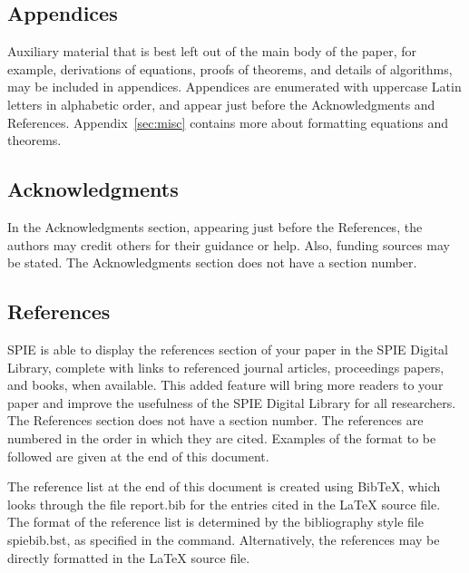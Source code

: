 \documentclass[nocompress]{spie}  %
\begin{document}
\subsection{Appendices}
Auxiliary material that is best left out of the main body of the paper, for example, derivations of equations, proofs of theorems, and details of algorithms, may be included in appendices.  Appendices are enumerated with uppercase Latin letters in alphabetic order, and appear just before the Acknowledgments and References. Appendix~\ref{sec:misc} contains more about formatting equations and theorems.

\subsection{Acknowledgments}
In the Acknowledgments section, appearing just before the References, the authors may credit others for their guidance or help.  Also, funding sources may be stated.  The Acknowledgments section does not have a section number.

\subsection{References}
SPIE is able to display the references section of your paper in the SPIE Digital Library, complete with links to referenced journal articles, proceedings papers, and books, when available. This added feature will bring more readers to your paper and improve the usefulness of the SPIE Digital Library for all researchers. The References section does not have a section number.  The references are numbered in the order in which they are cited.  Examples of the format to be followed are given at the end of this document.  

The reference list at the end of this document is created using BibTeX, which looks through the file {\ttfamily report.bib} for the entries cited in the LaTeX source file.  The format of the reference list is determined by the bibliography style file {\ttfamily spiebib.bst}, as specified in the \verb|| command.  Alternatively, the references may be directly formatted in the LaTeX source file.
\end{document}
